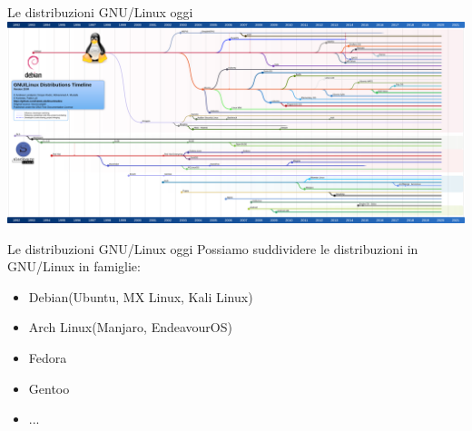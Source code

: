 \begin{frame}{Le distribuzioni GNU/Linux oggi}
    \centering
    \includegraphics[scale=0.18]{images/aygzaivcbmd51.png}
\end{frame}

\begin{frame}{Le distribuzioni GNU/Linux oggi}
Possiamo suddividere le distribuzioni in GNU/Linux in famiglie:
\begin{itemize}
    \item Debian(Ubuntu, MX Linux, Kali Linux)
    \item Arch Linux(Manjaro, EndeavourOS)
    \item Fedora
    \item Gentoo
    \item ...
\end{itemize}

\end{frame}

